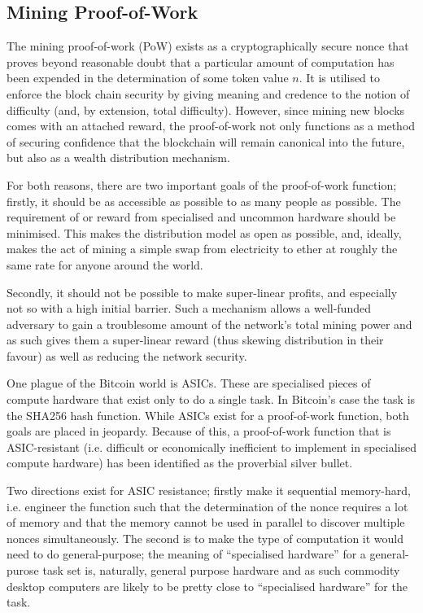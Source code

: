 \documentclass[9pt,oneside]{amsart}
\begin{document}
\begin{multicols}{2}
\subsection{Mining Proof-of-Work} \label{ch:pow}

The mining proof-of-work (PoW) exists as a cryptographically secure nonce that proves beyond reasonable doubt that a particular amount of computation has been expended in the determination of some token value $n$. It is utilised to enforce the block chain security by giving meaning and credence to the notion of difficulty (and, by extension, total difficulty). However, since mining new blocks comes with an attached reward, the proof-of-work not only functions as a method of securing confidence that the blockchain will remain canonical into the future, but also as a wealth distribution mechanism.

For both reasons, there are two important goals of the proof-of-work function; firstly, it should be as accessible as possible to as many people as possible. The requirement of or reward from specialised and uncommon hardware should be minimised. This makes the distribution model as open as possible, and, ideally, makes the act of mining a simple swap from electricity to ether at roughly the same rate for anyone around the world.

Secondly, it should not be possible to make super-linear profits, and especially not so with a high initial barrier. Such a mechanism allows a well-funded adversary to gain a troublesome amount of the network's total mining power and as such gives them a super-linear reward (thus skewing distribution in their favour) as well as reducing the network security.

One plague of the Bitcoin world is ASICs. These are specialised pieces of compute hardware that exist only to do a single task. In Bitcoin's case the task is the SHA256 hash function. While ASICs exist for a proof-of-work function, both goals are placed in jeopardy. Because of this, a proof-of-work function that is ASIC-resistant (i.e. difficult or economically inefficient to implement in specialised compute hardware) has been identified as the proverbial silver bullet.

Two directions exist for ASIC resistance; firstly make it sequential memory-hard, i.e. engineer the function such that the determination of the nonce requires a lot of memory and that the memory cannot be used in parallel to discover multiple nonces simultaneously. The second is to make the type of computation it would need to do general-purpose; the meaning of ``specialised hardware''  for a general-purose task set is, naturally, general purpose hardware and as such commodity desktop computers are likely to be pretty close to ``specialised hardware'' for the task. 


\end{multicols}
\end{document}
